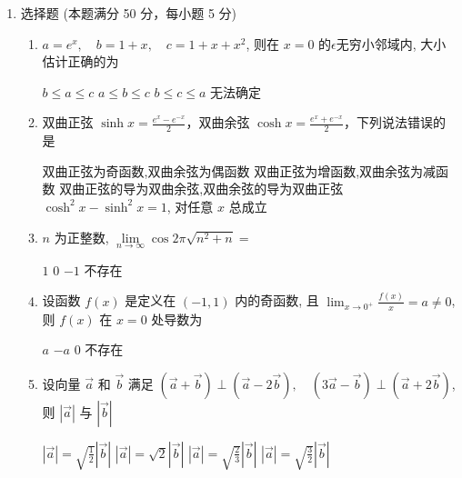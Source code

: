 


\begin{enumerate}
	\item
	选择题 (本题满分 50 分，每小题 5 分)
\begin{enumerate}
	\item
	$a=e^{x}, \quad b=1+x, \quad c=1+x+x^{2}$, 则在 $x=0$ 的$ \epsilon $无穷小邻域内, 大小估计正确的为  
	
\fourchoices
{$ b \leq a \leq c$}
{$a \leq b \leq c$}
{$b \leq c \leq a$}
{无法确定}

\item 
双曲正弦 $\sinh x=\frac{e^{x}-e^{-x}}{2} $，双曲余弦 $\cosh x=\frac{e^{x}+e^{-x}}{2}$，下列说法错误的是	  


\fourchoices
{双曲正弦为奇函数,双曲余弦为偶函数}
{双曲正弦为增函数,双曲余弦为减函数}
{双曲正弦的导为双曲余弦,双曲余弦的导为双曲正弦}
{$\cosh ^{2} x-\sinh ^{2} x=1$, 对任意 $x$ 总成立}

\item 
$n$ 为正整数, $\lim\limits _{n \rightarrow \infty} \cos 2 \pi \sqrt{n^{2}+n}=$  

\fourchoices
{$ 1 $}
{$ 0 $}
{$-1$}
{不存在}

\item 
设函数 $f(x)$ 是定义在 $(-1,1)$ 内的奇函数, 且 $\lim _{x \rightarrow 0^{+}} \frac{f(x)}{x}=a \neq 0$, 则 $f(x)$ 在 $x=0$ 处导数为  

\fourchoices
{$a$}
{$-a$}
{$ 0 $}
{不存在}

\item 
设向量 $\vec{a}$ 和 $\vec{b}$ 满足 $(\vec{a}+\vec{b}) \perp(\vec{a}-2 \vec{b}), \quad(3 \vec{a}-\vec{b}) \perp(\vec{a}+2 \vec{b})$, 则 $|\vec{a}|$ 与 $|\vec{b}|$  

\fourchoices
{$|\vec{a}|=\sqrt{\frac{1}{2}} |\vec{b}|$}
{$|\vec{a}|=\sqrt{2}|\vec{b}|$}
{$|\vec{a}|=\sqrt{\frac{2}{3}} |\vec{b}|$}
{$|\vec{a}|=\sqrt{\frac{3}{2}} |\vec{b}|$}


\end{enumerate}
\end{enumerate}
